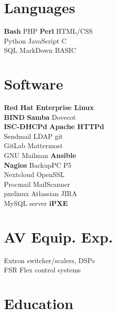 \documentclass[letterpaper]{deedy-resume-openfont}
\begin{document}



\begin{minipage}[t]{0.27\textwidth}
\section{Languages}
\textbf{Bash} \textbullet{} PHP \textbullet{} \textbf{Perl} \textbullet{} HTML/CSS \\
Python \textbullet{} JavaScript \textbullet{} C \\
SQL \textbullet{} MarkDown \textbullet{} BASIC

\section{Software}
\textbf{Red Hat Enterprise Linux} \\
\textbf{BIND} \textbullet{} \textbf{Samba} \textbullet{} Dovecot \\
\textbf{ISC-DHCPd} \textbullet{} \textbf{Apache HTTPd} \\
Sendmail \textbullet{} LDAP \textbullet{} git \\
GitLab \textbullet{}  Mattermost \\
GNU Mailman \textbullet{} \textbf{Ansible} \\
\textbf{Nagios} \textbullet{} BackupPC \textbullet{} P5 \\
Nextcloud \textbullet{} OpenSSL \\
Procmail \textbullet{} MailScanner \\
pxelinux \textbullet{} Atlassian JIRA \\
MySQL server \textbullet{} \textbf{iPXE}


\section{AV Equip. Exp.}
Extron switcher/scalers, DSPs \\
FSR Flex control systems


\section{Education}

\end{minipage}
\end{document}
